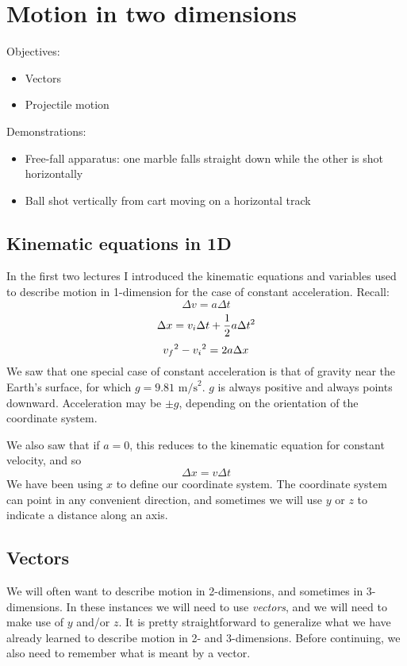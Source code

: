 \section{Motion in two dimensions}
Objectives:
\begin{itemize}
\item Vectors
\item Projectile motion
\end{itemize}

Demonstrations:
\begin{itemize}
\item Free-fall apparatus: one marble falls straight down while the other is shot horizontally
\item Ball shot vertically from cart moving on a horizontal track
\end{itemize}

\subsection{Kinematic equations in 1D}
In the first two lectures I introduced the kinematic equations and variables used to describe motion in 1-dimension for the case of constant acceleration. Recall:
$$\Delta{v}=a\Delta{t}$$
$$\Delta{x}=v_i\Delta{t}+\frac{1}{2}a\Delta{t}\displaystyle^2$$
$$v_f\displaystyle^2-v_i\displaystyle^2=2a\Delta{x}$$
We saw that one special case of constant acceleration is that of gravity near the Earth's surface, for which $g=9.81\mbox{ m/s}^2$. $g$ is always positive and always points downward. Acceleration may be $\pm g$, depending on the orientation of the coordinate system.

We also saw that if $a=0$, this reduces to the kinematic equation for constant velocity, and so
$$\Delta{x}=v\Delta{t}$$
We have been using $x$ to define our coordinate system. The coordinate system can point in any convenient direction, and sometimes we will use $y$ or $z$ to indicate a distance along an axis.

\subsection{Vectors}
We will often want to describe motion in 2-dimensions, and sometimes in 3-dimensions. In these instances we will need to use \textit{vectors}, and we will need to make use of $y$ and/or $z$. It is pretty straightforward to generalize what we have already learned to describe motion in 2- and 3-dimensions. Before continuing, we also need to remember what is meant by a vector.

